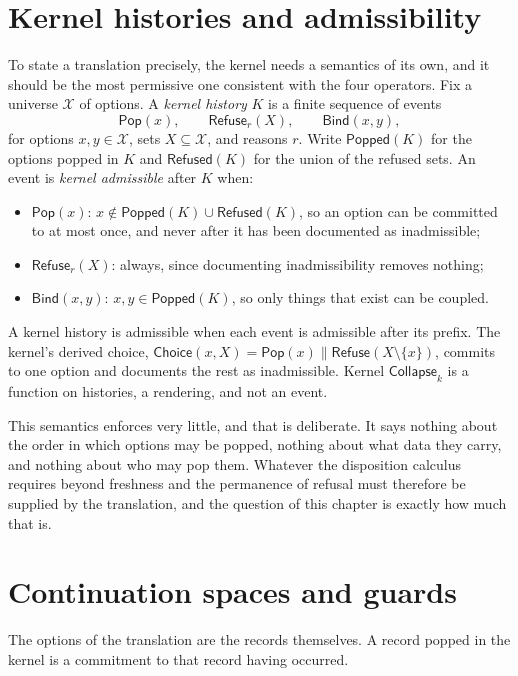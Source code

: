\documentclass[11pt,openany]{book}
\theoremstyle{remark}
\newcommand{\Pop}{\mathsf{Pop}}
\newcommand{\Refuse}{\mathsf{Refuse}}
\newcommand{\Bind}{\mathsf{Bind}}
\newcommand{\Collapse}{\mathsf{Collapse}}
\begin{document}
\section{Kernel histories and admissibility}

To state a translation precisely, the kernel needs a semantics of its own,
and it should be the most permissive one consistent with the four
operators. Fix a universe $\mathcal X$ of options. A \emph{kernel history}
$K$ is a finite sequence of events
\[
\Pop(x),\qquad \Refuse_r(X),\qquad \Bind(x,y),
\]
for options $x,y\in\mathcal X$, sets $X\subseteq\mathcal X$, and reasons
$r$. Write $\mathsf{Popped}(K)$ for the options popped in $K$ and
$\mathsf{Refused}(K)$ for the union of the refused sets. An event is
\emph{kernel admissible} after $K$ when:
\begin{itemize}[leftmargin=1.5em]
\item $\Pop(x)$: $x\notin\mathsf{Popped}(K)\cup\mathsf{Refused}(K)$, so an
option can be committed to at most once, and never after it has been
documented as inadmissible;
\item $\Refuse_r(X)$: always, since documenting inadmissibility removes
nothing;
\item $\Bind(x,y)$: $x,y\in\mathsf{Popped}(K)$, so only things that exist
can be coupled.
\end{itemize}
A kernel history is admissible when each event is admissible after its
prefix. The kernel's derived choice, $\mathsf{Choice}(x,X)=\Pop(x)\parallel
\Refuse(X\setminus\{x\})$, commits to one option and documents the rest as
inadmissible. Kernel $\Collapse_k$ is a function on histories, a
rendering, and not an event.

This semantics enforces very little, and that is deliberate. It says
nothing about the order in which options may be popped, nothing about
what data they carry, and nothing about who may pop them. Whatever the
disposition calculus requires beyond freshness and the permanence of
refusal must therefore be supplied by the translation, and the question
of this chapter is exactly how much that is.

\section{Continuation spaces and guards}

The options of the translation are the records themselves. A record
popped in the kernel is a commitment to that record having occurred.
\end{document}
